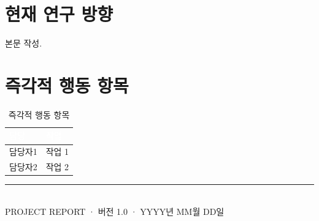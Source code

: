 \documentclass[11pt,a4paper]{article}
\begin{document}
\section{현재 연구 방향}
본문 작성.

\section{즉각적 행동 항목}
\begin{table}[H]
\centering\small
\begin{tabularx}{\linewidth}{|l|X|}
\hline
\rowcolor{tabhead}\textcolor{white}{\textbf{담당}} & \textcolor{white}{\textbf{작업}} \\
\hline
담당자1 & 작업 1 \\
\hline
담당자2 & 작업 2 \\
\hline
\end{tabularx}
\caption{즉각적 행동 항목}
\end{table}

\vfill
\begin{center}
\small\color{gray}\rule{0.5\linewidth}{0.4pt}\\[4pt]
PROJECT REPORT · 버전 1.0 · YYYY년 MM월 DD일
\end{center}
\end{document}
